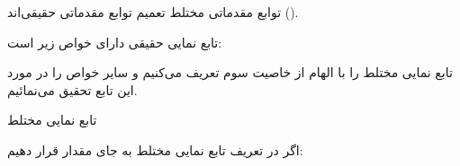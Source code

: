 توابع مقدماتی مختلط تعمیم توابع مقدماتی حقیقی‌اند ().

\EMhold


\begin{EMunit}

تابع نمایی حقیقی  دارای خواص زیر است:


\end{EMunit}

تابع نمایی مختلط را با الهام از خاصیت سوم تعریف می‌کنیم و سایر خواص را در مورد این تابع تحقیق می‌نمائیم.

\begin{EMdefinition}{تابع نمایی مختلط}


\end{EMdefinition}

\begin{EMunit}

اگر در تعریف تابع نمایی مختلط به جای  مقدار  قرار دهیم:


\end{EMunit}

\begin{EMimportant}{}


\end{EMimportant}

